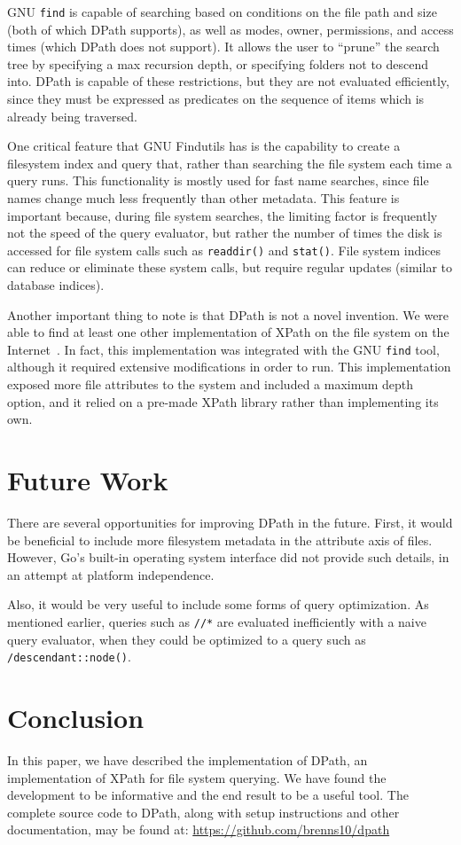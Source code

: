 \documentclass{scrartcl}
\begin{document}
GNU \texttt{find} is capable of searching based on conditions on the file path
and size (both of which DPath supports), as well as modes, owner, permissions,
and access times (which DPath does not support). It allows the user to ``prune''
the search tree by specifying a max recursion depth, or specifying folders not
to descend into. DPath is capable of these restrictions, but they are not
evaluated efficiently, since they must be expressed as predicates on the
sequence of items which is already being traversed.

One critical feature that GNU Findutils has is the capability to create a
filesystem index and query that, rather than searching the file system each time
a query runs. This functionality is mostly used for fast name searches, since
file names change much less frequently than other metadata. This feature is
important because, during file system searches, the limiting factor is
frequently not the speed of the query evaluator, but rather the number of times
the disk is accessed for file system calls such as \texttt{readdir()} and
\texttt{stat()}. File system indices can reduce or eliminate these system calls,
but require regular updates (similar to database indices).

Another important thing to note is that DPath is not a novel invention. We were
able to find at least one other implementation of XPath on the file system on
the Internet~\cite{other}. In fact, this implementation was integrated with the
GNU \texttt{find} tool, although it required extensive modifications in order to
run. This implementation exposed more file attributes to the system and included
a maximum depth option, and it relied on a pre-made XPath library rather than
implementing its own.

\section{Future Work}
\label{sec:future}

There are several opportunities for improving DPath in the future. First, it
would be beneficial to include more filesystem metadata in the attribute axis of
files. However, Go's built-in operating system interface did not provide such
details, in an attempt at platform independence.

Also, it would be very useful to include some forms of query optimization. As
mentioned earlier, queries such as \texttt{//*} are evaluated inefficiently with
a naive query evaluator, when they could be optimized to a query such as
\texttt{/descendant::node()}.

\section{Conclusion}

In this paper, we have described the implementation of DPath, an implementation
of XPath for file system querying. We have found the development to be
informative and the end result to be a useful tool. The complete source code to
DPath, along with setup instructions and other documentation, may be found at:
\url{https://github.com/brenns10/dpath}



\end{document}
